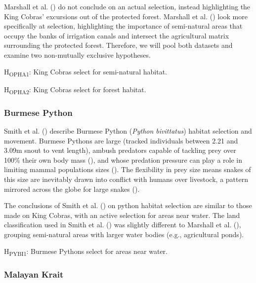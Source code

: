 \documentclass[10pt,a4paper]{article}
\begin{document}
Marshall et al. () do not conclude on an actual selection, instead highlighting the King Cobras' excursions out of the protected forest.
Marshall et al. () look more specifically at selection, highlighting the importance of semi-natural areas that occupy the banks of irrigation canals and intersect the agricultural matrix surrounding the protected forest.
Therefore, we will pool both datasets and examine two non-mutually exclusive hypotheses.

H\textsubscript{OPHA1}: King Cobras select for semi-natural habitat.

H\textsubscript{OPHA2}: King Cobras select for forest habitat.

\subsubsection{Burmese Python}\label{burmese-python}

Smith et al. () describe Burmese Python (\emph{Python bivittatus}) habitat selection and movement.
Burmese Pythons are large (tracked individuals between 2.21 and 3.09m snout to vent length), ambush predators capable of tackling prey over 100\% their own body mass (), and whose predation pressure can play a role in limiting mammal populations sizes ().
The flexibility in prey size means snakes of this size are inevitably drawn into conflict with humans over livestock, a pattern mirrored across the globe for large snakes ().

The conclusions of Smith et al. () on python habitat selection are similar to those made on King Cobras, with an active selection for areas near water.
The land classification used in Smith et al. () was slightly different to Marshall et al. (), grouping semi-natural areas with larger water bodies (e.g., agricultural ponds).

H\textsubscript{PYBI1}: Burmese Pythons select for areas near water.

\subsubsection{Malayan Krait}\label{malayan-krait}
\end{document}
